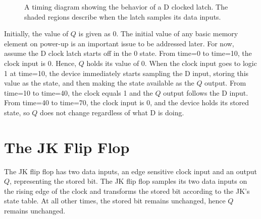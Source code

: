 \begin{figure}[ht]
\caption{A timing diagram showing the behavior of a D clocked latch.
The shaded regions describe when the latch samples its data inputs.}
\label{fig:DCL}
\end{figure}

Initially, the value of $Q$ is given as 0.  The initial value
of any basic memory element on power-up is an important issue 
to be addressed later. For now, assume the
D clock latch starts off in the 0 state.  From time=0 to time=10, the 
clock input is 0. Hence, $Q$ holds its value of 0.  When the 
clock input goes to logic 1 at time=10, the device immediately
starts sampling the D input, storing this value as the state, 
and then making the state available as the $Q$ output.  From
time=10 to time=40, the clock equals 1 and the $Q$ output follows 
the D input.  From time=40 to time=70, the clock input is 0, and
the device holds its stored state, so $Q$ does not change
regardless of what D is doing.

\section{The JK Flip Flop}
The JK flip flop has two data inputs, an edge sensitive clock 
input and an output $Q$, representing the stored bit.  The 
JK flip flop samples its two data inputs on the rising edge 
of the clock and transforms the stored bit according to the 
JK's state table.  At all other times, the stored bit remains
unchanged, hence $Q$ remains unchanged.

